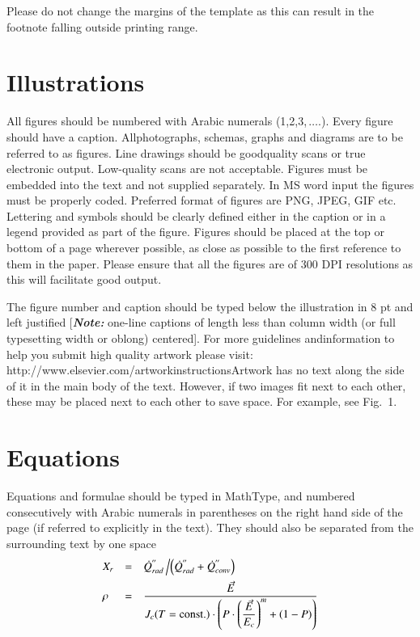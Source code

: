 \documentclass[5p,times,procedia]{elsarticle}
\begin{document}
Please do not change the margins of the template as this can result in the footnote falling outside printing range.


\section{Illustrations}
All figures should be numbered with Arabic numerals (1,2,3,$\,\ldots.$). Every figure should have a caption. All\break photographs, schemas, graphs and diagrams are to be referred to as figures. Line drawings should be good\break quality scans or true electronic output. Low-quality scans are not acceptable. Figures must be embedded into the text and not supplied separately. In MS word input the figures must be properly coded. Preferred format of figures are PNG, JPEG, GIF etc. Lettering and symbols should be clearly defined either in the caption or in a legend provided as part of the figure. Figures should be placed at the top or bottom of a page wherever possible, as close as possible to the first reference to them in the paper. Please ensure that all the figures are of 300 DPI resolutions as this will facilitate good output.

The figure number and caption should be typed below the illustration in 8 pt and left justified [{\bfseries\itshape Note:} one-line captions of length less than column width (or full typesetting width or oblong) centered]. For more guidelines and\break information to help you submit high quality artwork please visit: http://www.elsevier.com/artworkinstructions\break Artwork has no text along the side of it in the main body of the text. However, if two images fit next to each other, these may be placed next to each other to save space. For example, see Fig.~1.


\section{Equations}
Equations and formulae should be typed in MathType, and numbered consecutively with Arabic numerals in parentheses on the right hand side of the page (if referred to explicitly in the text). They should also be separated from the surrounding text by one space
\begin{equation}
\begin{array}{lcl}
\displaystyle X_r &=& \displaystyle\dot{Q}^{''}_{rad}\left/\left(\dot{Q}^{''}_{rad} + \dot{Q}^{''}_{conv}\right)\right.\\[6pt]
\displaystyle \rho &=& \displaystyle\frac{\vec{E}}{J_c(T={\rm const.})\cdot\left(P\cdot\left(\displaystyle\frac{\vec{E}}{E_c}\right)^m+(1-P)\right)}
\end{array}
\end{equation}
\end{document}

